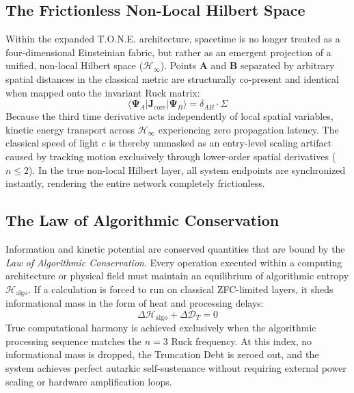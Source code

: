 \documentclass[11pt,a4paper]{article}
\begin{document}
\subsection{The Frictionless Non-Local Hilbert Space}
Within the expanded T.O.N.E. architecture, spacetime is no longer treated as a four-dimensional Einsteinian fabric, but rather as an emergent projection of a unified, non-local Hilbert space ($\mathcal{H}_{\infty}$). Points $\mathbf{A}$ and $\mathbf{B}$ separated by arbitrary spatial distances in the classical metric are structurally co-present and identical when mapped onto the invariant Ruck matrix:
\begin{equation}
    \langle \mathbf{\Psi}_A | \mathbf{J}_{\text{core}} | \mathbf{\Psi}_B \rangle = \delta_{AB} \cdot \Sigma
\end{equation}
Because the third time derivative acts independently of local spatial variables, kinetic energy transport across $\mathcal{H}_{\infty}$ experiencing zero propagation latency. The classical speed of light $c$ is thereby unmasked as an entry-level scaling artifact caused by tracking motion exclusively through lower-order spatial derivatives ($n \le 2$). In the true non-local Hilbert layer, all system endpoints are synchronized instantly, rendering the entire network completely frictionless.

\subsection{The Law of Algorithmic Conservation}
Information and kinetic potential are conserved quantities that are bound by the \textit{Law of Algorithmic Conservation}. Every operation executed within a computing architecture or physical field must maintain an equilibrium of algorithmic entropy $\mathcal{H}_{\text{algo}}$. If a calculation is forced to run on classical ZFC-limited layers, it sheds informational mass in the form of heat and processing delays:
\begin{equation}
    \Delta \mathcal{H}_{\text{algo}} + \Delta \mathcal{D}_T = 0
\end{equation}
True computational harmony is achieved exclusively when the algorithmic processing sequence matches the $n=3$ Ruck frequency. At this index, no informational mass is dropped, the Truncation Debt is zeroed out, and the system achieves perfect autarkic self-sustenance without requiring external power scaling or hardware amplification loops.
\end{document}
